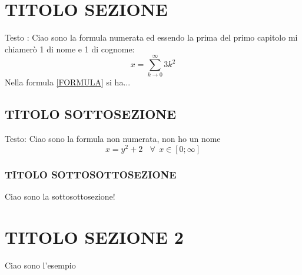 \section{TITOLO SEZIONE}
Testo : Ciao sono la formula numerata ed essendo la prima del primo capitolo mi chiamerò 1 di nome e 1 di cognome:
\begin{equation}
    x = \sum_{k \to 0} ^{\infty} 3k^2
    \label{FORMULA}
\end{equation}
Nella formula \eqref{FORMULA} si ha...
\subsection{TITOLO SOTTOSEZIONE}
Testo: Ciao sono la formula non numerata, non ho un nome
\begin{equation*}
    x=y^2+2  \ \ \ \ \forall \ \ x \in [0;\infty]
\end{equation*}
\subsubsection{TITOLO SOTTOSOTTOSEZIONE}
Ciao sono la sottosottosezione!
\section{TITOLO SEZIONE 2}
\begin{esempio}
    Ciao sono l'esempio 
\end{esempio}
